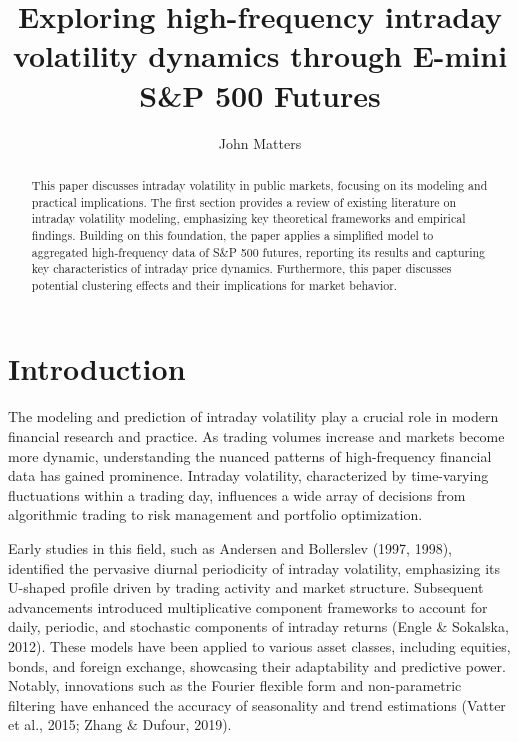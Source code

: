 \documentclass[12pt,a4paper]{article}
\title{Exploring high-frequency intraday volatility dynamics through E-mini S\&P 500 Futures}
\author{John Matters}
\affil{\small Department of Operations Research and Financial Engineering \\ Princeton University}
\date{}  %
\begin{document}
\maketitle

\begin{abstract}
    This paper discusses intraday volatility in public markets, focusing 
    on its modeling and practical implications. The first section provides a 
    review of existing literature on intraday volatility modeling, 
    emphasizing key theoretical frameworks and empirical findings. 
    Building on this foundation, the paper applies a simplified model to 
    aggregated high-frequency data of S\&P 500 futures, reporting its results and 
    capturing key characteristics of intraday price dynamics. 
    Furthermore, this paper discusses potential clustering effects
    and their implications for market behavior. %
\end{abstract}


\section{Introduction}
The modeling and prediction of intraday volatility play a crucial role in modern 
financial research and practice. As trading volumes increase and markets become more 
dynamic, understanding the nuanced patterns of high-frequency financial data has 
gained prominence. Intraday volatility, characterized by time-varying fluctuations 
within a trading day, influences a wide array of decisions from algorithmic trading 
to risk management and portfolio optimization.

Early studies in this field, such as Andersen and Bollerslev (1997, 1998), 
identified the pervasive diurnal periodicity of intraday volatility, emphasizing 
its U-shaped profile driven by trading activity and market structure. Subsequent 
advancements introduced multiplicative component frameworks to account for daily, 
periodic, and stochastic components of intraday returns (Engle \& Sokalska, 2012). 
These models have been applied to various asset classes, including equities, bonds, 
and foreign exchange, showcasing their adaptability and predictive power. Notably, 
innovations such as the Fourier flexible form and non-parametric filtering have 
enhanced the accuracy of seasonality and trend estimations (Vatter et al., 2015; 
Zhang \& Dufour, 2019).
\end{document}
